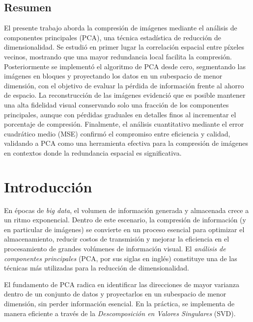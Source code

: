 \documentclass[12pt]{article}
\begin{document}
\begin{center}
    \section*{\small Resumen}
    \begin{justify}
    \small
    El presente trabajo aborda la compresión de imágenes mediante el análisis de componentes principales (PCA), una técnica estadística de reducción de dimensionalidad. Se estudió en primer lugar la correlación espacial entre píxeles vecinos, mostrando que una mayor redundancia local facilita la compresión. Posteriormente se implementó el algoritmo de PCA desde cero, segmentando las imágenes en bloques y proyectando los datos en un subespacio de menor dimensión, con el objetivo de evaluar la pérdida de información frente al ahorro de espacio. La reconstrucción de las imágenes evidenció que es posible mantener una alta fidelidad visual conservando solo una fracción de los componentes principales, aunque con pérdidas graduales en detalles finos al incrementar el porcentaje de compresión. Finalmente, el análisis cuantitativo mediante el error cuadrático medio (MSE) confirmó el compromiso entre eficiencia y calidad, validando a PCA como una herramienta efectiva para la compresión de imágenes en contextos donde la redundancia espacial es significativa.
    \end{justify}

    \vspace*{\fill}
\end{center}
\newpage

\setcounter{page}{1}    %
\pagestyle{plain}       %

\section{Introducción}

En épocas de \textit{big data}, el volumen de información generada y almacenada crece a un ritmo exponencial. Dentro de este escenario, la compresión de información (y en particular de imágenes) se convierte en un proceso esencial para optimizar el almacenamiento, reducir costos de transmisión y mejorar la eficiencia en el procesamiento de grandes volúmenes de información visual. El \textit{análisis de componentes principales} (PCA, por sus siglas en inglés) constituye una de las técnicas más utilizadas para la reducción de dimensionalidad.
\par\vspace{0.4cm}
El fundamento de PCA radica en identificar las direcciones de mayor varianza dentro de un conjunto de datos y proyectarlos en un subespacio de menor dimensión, sin perder información esencial. En la práctica, se implementa de manera eficiente a través de la \textit{Descomposición en Valores Singulares} (SVD). 
\end{document}
